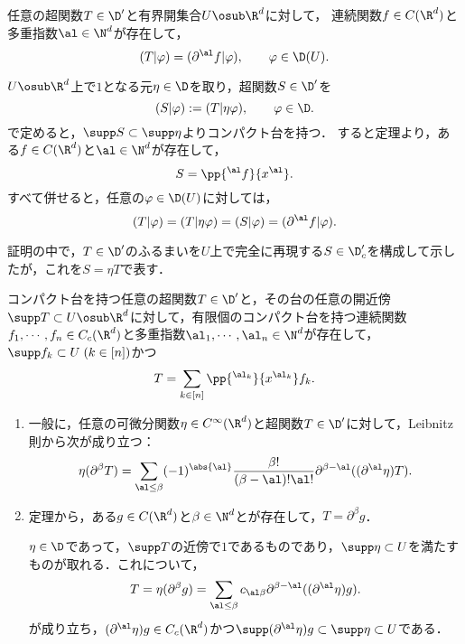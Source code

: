 \documentclass[uplatex,dvipdfmx]{jsreport}
\begin{document}
\begin{corollary}[一般の超関数も局所的には連続関数の微分である]
    任意の超関数$T\in\D'$と有界開集合$U\osub\R^d$に対して，
    連続関数$f\in C(\R^d)$と多重指数$\al\in\N^d$が存在して，
    \[(T|\varphi)=(\partial^\al f|\varphi),\qquad\varphi\in\D(U).\]
\end{corollary}
\begin{Proof}
    $U\osub\R^d$上で$1$となる元$\eta\in\D$を取り，超関数$S\in\D'$を
    \[(S|\varphi):=(T|\eta\varphi),\qquad\varphi\in\D.\]
    で定めると，$\supp S\subset\supp\eta$よりコンパクト台を持つ．
    すると定理より，ある$f\in C(\R^d)$と$\al\in\N^d$が存在して，
    \[S=\pp{^\al f}{x^\al}.\]
    すべて併せると，任意の$\varphi\in\D(U)$に対しては，
    \[(T|\varphi)=(T|\eta\varphi)=(S|\varphi)=(\partial^\al f|\varphi).\]
\end{Proof}
\begin{remarks}
    証明の中で，$T\in\D'$のふるまいを$U$上で完全に再現する$S\in\D'_c$を構成して示したが，これを$S=\eta T$で表す．
\end{remarks}

\begin{corollary}[コンパクト台を持つ超関数はコンパクト台を持つ連続関数の微分の有限和である]
    コンパクト台を持つ任意の超関数$T\in\D'$と，その台の任意の開近傍$\supp T\subset U\osub\R^d$に対して，有限個のコンパクト台を持つ連続関数$f_1,\cdots,f_n\in C_c(\R^d)$と多重指数$\al_1,\cdots,\al_n\in\N^d$が存在して，$\supp f_k\subset U\;(k\in[n])$かつ
    \[T=\sum_{k\in[n]}\pp{^{\al_k}}{x^{\al_k}}f_k.\]
\end{corollary}
\begin{Proof}\mbox{}
    \begin{enumerate}[{Step}1]
        \item 一般に，任意の可微分関数$\eta\in C^\infty(\R^d)$と超関数$T\in\D'$に対して，Leibnitz則から次が成り立つ：
        \[\eta(\partial^\beta T)=\sum_{\al\le\beta}(-1)^{\abs{\al}}\frac{\beta!}{(\beta-\al)!\al!}\partial^{\beta-\al}((\partial^\al\eta)T).\]
        \item 定理から，ある$g\in C(\R^d)$と$\beta\in\N^d$とが存在して，$T=\partial^\beta g$．
        
        $\eta\in\D$であって，$\supp T$の近傍で$1$であるものであり，$\supp\eta\subset U$を満たすものが取れる．これについて，
        \[T=\eta(\partial^\beta g)=\sum_{\al\le\beta}c_{\al\beta}\partial^{\beta-\al}((\partial^\al\eta)g).\]
        が成り立ち，$(\partial^\al\eta)g\in C_c(\R^d)$かつ$\supp(\partial^\al\eta)g\subset \supp\eta\subset U$である．
    \end{enumerate}
\end{Proof}
\end{document}

